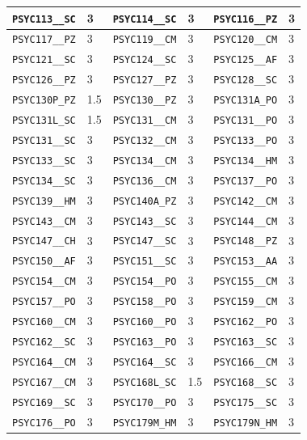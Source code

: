 \begin{longtable}{|l|l||l|l||l|l|}
    \verb|PSYC113__SC| & 3 & \verb|PSYC114__SC| & 3 & \verb|PSYC116__PZ| & 3\\\hline
    \verb|PSYC117__PZ| & 3 & \verb|PSYC119__CM| & 3 & \verb|PSYC120__CM| & 3\\\hline
    \verb|PSYC121__SC| & 3 & \verb|PSYC124__SC| & 3 & \verb|PSYC125__AF| & 3\\\hline
    \verb|PSYC126__PZ| & 3 & \verb|PSYC127__PZ| & 3 & \verb|PSYC128__SC| & 3\\\hline
    \verb|PSYC130P_PZ| & 1.5 & \verb|PSYC130__PZ| & 3 & \verb|PSYC131A_PO| & 3\\\hline
    \verb|PSYC131L_SC| & 1.5 & \verb|PSYC131__CM| & 3 & \verb|PSYC131__PO| & 3\\\hline
    \verb|PSYC131__SC| & 3 & \verb|PSYC132__CM| & 3 & \verb|PSYC133__PO| & 3\\\hline
    \verb|PSYC133__SC| & 3 & \verb|PSYC134__CM| & 3 & \verb|PSYC134__HM| & 3\\\hline
    \verb|PSYC134__SC| & 3 & \verb|PSYC136__CM| & 3 & \verb|PSYC137__PO| & 3\\\hline
    \verb|PSYC139__HM| & 3 & \verb|PSYC140A_PZ| & 3 & \verb|PSYC142__CM| & 3\\\hline
    \verb|PSYC143__CM| & 3 & \verb|PSYC143__SC| & 3 & \verb|PSYC144__CM| & 3\\\hline
    \verb|PSYC147__CH| & 3 & \verb|PSYC147__SC| & 3 & \verb|PSYC148__PZ| & 3\\\hline
    \verb|PSYC150__AF| & 3 & \verb|PSYC151__SC| & 3 & \verb|PSYC153__AA| & 3\\\hline
    \verb|PSYC154__CM| & 3 & \verb|PSYC154__PO| & 3 & \verb|PSYC155__CM| & 3\\\hline
    \verb|PSYC157__PO| & 3 & \verb|PSYC158__PO| & 3 & \verb|PSYC159__CM| & 3\\\hline
    \verb|PSYC160__CM| & 3 & \verb|PSYC160__PO| & 3 & \verb|PSYC162__PO| & 3\\\hline
    \verb|PSYC162__SC| & 3 & \verb|PSYC163__PO| & 3 & \verb|PSYC163__SC| & 3\\\hline
    \verb|PSYC164__CM| & 3 & \verb|PSYC164__SC| & 3 & \verb|PSYC166__CM| & 3\\\hline
    \verb|PSYC167__CM| & 3 & \verb|PSYC168L_SC| & 1.5 & \verb|PSYC168__SC| & 3\\\hline
    \verb|PSYC169__SC| & 3 & \verb|PSYC170__PO| & 3 & \verb|PSYC175__SC| & 3\\\hline
    \verb|PSYC176__PO| & 3 & \verb|PSYC179M_HM| & 3 & \verb|PSYC179N_HM| & 3\\\hline

\end{longtable}
